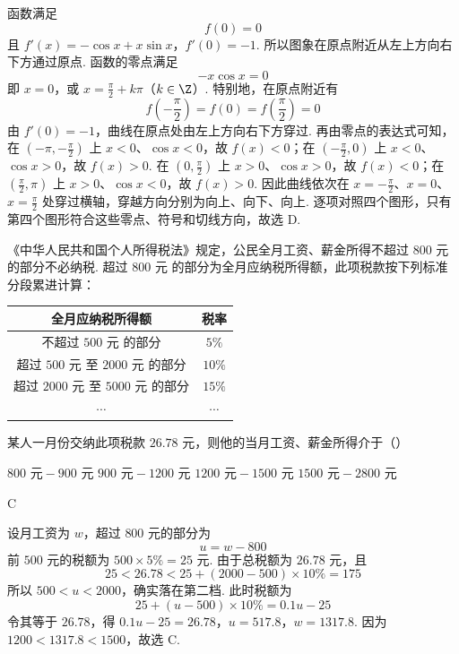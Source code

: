 \begin{solution}
函数满足
\[
f(0)=0
\]
且 \(f'(x)=-\cos x+x\sin x\)，\(f'(0)=-1\).
所以图象在原点附近从左上方向右下方通过原点. 函数的零点满足
\[
-x\cos x=0
\]
即 \(x=0\)，或 \(x=\frac{\pi}{2}+k\pi\)（\(k\in\Z\)）. 特别地，在原点附近有
\[
f\left(-\frac{\pi}{2}\right)=f(0)=f\left(\frac{\pi}{2}\right)=0
\]
由 \(f'(0)=-1\)，曲线在原点处由左上方向右下方穿过. 再由零点的表达式可知，在 \((-\pi,-\frac{\pi}{2})\) 上 \(x<0\)、\(\cos x<0\)，故 \(f(x)<0\)；在 \((-\frac{\pi}{2},0)\) 上 \(x<0\)、\(\cos x>0\)，故 \(f(x)>0\). 在 \((0,\frac{\pi}{2})\) 上 \(x>0\)、\(\cos x>0\)，故 \(f(x)<0\)；在 \((\frac{\pi}{2},\pi)\) 上 \(x>0\)、\(\cos x<0\)，故 \(f(x)>0\). 因此曲线依次在 \(x=-\frac{\pi}{2}\)、\(x=0\)、\(x=\frac{\pi}{2}\) 处穿过横轴，穿越方向分别为向上、向下、向上. 逐项对照四个图形，只有第四个图形符合这些零点、符号和切线方向，故选 D.
\end{solution}

\begin{problem}
《中华人民共和国个人所得税法》规定，公民全月工资、薪金所得不超过 \(800\text{ 元}\) 的部分不必纳税. 超过 \(800\text{ 元}\) 的部分为全月应纳税所得额，此项税款按下列标准分段累进计算：

\begin{center}
\begin{tabular}{|c|c|}
\hline
全月应纳税所得额 & 税率 \\
\hline
不超过 \(500\text{ 元}\) 的部分 & \(5\%\) \\
\hline
超过 \(500\text{ 元}\) 至 \(2000\text{ 元}\) 的部分 & \(10\%\) \\
\hline
超过 \(2000\text{ 元}\) 至 \(5000\text{ 元}\) 的部分 & \(15\%\) \\
\hline
\(\cdots\) & \(\cdots\) \\
\hline
\end{tabular}
\end{center}

某人一月份交纳此项税款 \(26.78\text{ 元}\)，则他的当月工资、薪金所得介于（\quad）

\choices
    {\(800\text{ 元} - 900\text{ 元}\)}
    {\(900\text{ 元} - 1200\text{ 元}\)}
    {\(1200\text{ 元} - 1500\text{ 元}\)}
    {\(1500\text{ 元} - 2800\text{ 元}\)}
\end{problem}

\begin{answer}
C
\end{answer}

\begin{solution}
设月工资为 \(w\)，超过 \(800\) 元的部分为
\[
u=w-800
\]
前 \(500\) 元的税额为 \(500\times5\%=25\) 元. 由于总税额为 \(26.78\) 元，且
\[
25<26.78<25+(2000-500)\times10\%=175
\]
所以 \(500<u<2000\)，确实落在第二档. 此时税额为
\[
25+(u-500)\times10\%=0.1u-25
\]
令其等于 \(26.78\)，得 \(0.1u-25=26.78\)，\(u=517.8\)，\(w=1317.8\).
因为 \(1200<1317.8<1500\)，故选 C.
\end{solution}

